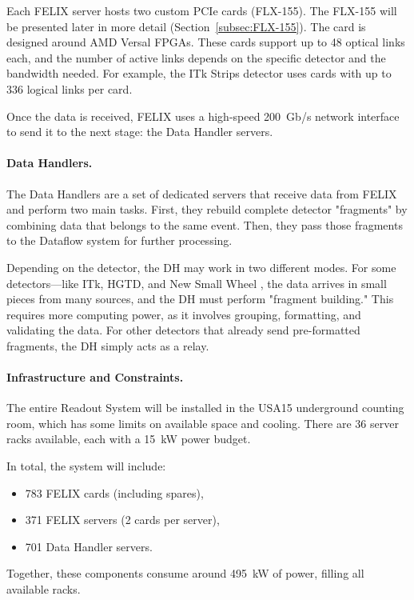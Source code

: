 Each \acs{FELIX} server hosts two custom \acs{PCIe} cards (FLX-155). The FLX-155 will be presented later in more detail (Section~\ref{subsec:FLX-155}). The card is designed around AMD Versal \acs{FPGA}s. These cards support up to 48 optical links each, and the number of active links depends on the specific detector and the bandwidth needed. For example, the \acs{ITk} Strips detector uses cards with up to 336 logical links per card.

Once the data is received, \acs{FELIX} uses a high-speed 200~Gb/s network interface to send it to the next stage: the Data Handler servers.

\paragraph{Data Handlers.}
The Data Handlers are a set of dedicated servers that receive data from \acs{FELIX} and perform two main tasks. First, they rebuild complete detector "fragments" by combining data that belongs to the same event. Then, they pass those fragments to the Dataflow system for further processing.

Depending on the detector, the \acs{DH} may work in two different modes. For some detectors—like \acs{ITk}, \acs{HGTD}, and New Small Wheel \cite{nsw}, the data arrives in small pieces from many sources, and the \acs{DH} must perform "fragment building." This requires more computing power, as it involves grouping, formatting, and validating the data. For other detectors that already send pre-formatted fragments, the \acs{DH} simply acts as a relay.

\paragraph{Infrastructure and Constraints.}
The entire Readout System will be installed in the USA15 underground counting room, which has some limits on available space and cooling. There are 36 server racks available, each with a 15~kW power budget.

In total, the system will include:
\begin{itemize}
    \item 783 \acs{FELIX} cards (including spares),
    \item 371 \acs{FELIX} servers (2 cards per server),
    \item 701 Data Handler servers.
\end{itemize}

Together, these components consume around 495~kW of power, filling all available racks.


